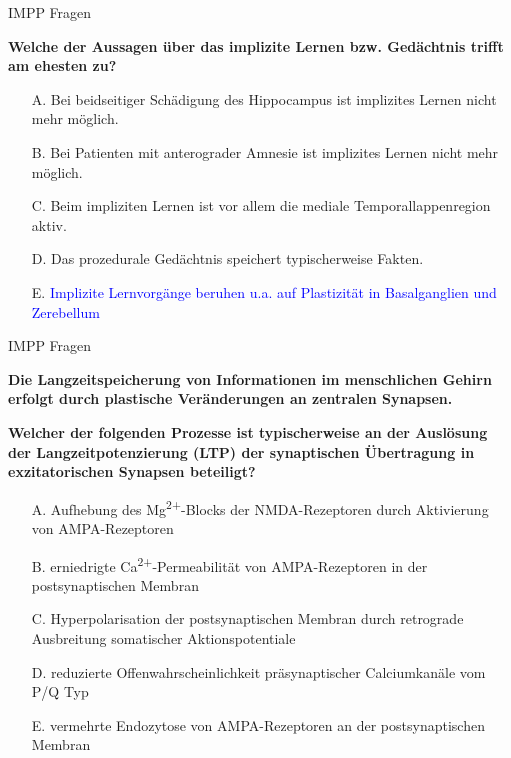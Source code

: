 \documentclass{beamer}
\begin{document}
\begin{frame}{IMPP Fragen}

\textbf{Welche der Aussagen über das implizite Lernen bzw. Gedächtnis trifft am ehesten zu?} \\[0.2 cm]

\begin{itemize}
\item[A.] Bei beidseitiger Schädigung des Hippocampus ist implizites Lernen nicht mehr möglich.
\item[B.] Bei Patienten mit anterograder Amnesie ist implizites Lernen nicht mehr möglich.
\item[C.] Beim impliziten Lernen ist vor allem die mediale Temporallappenregion aktiv.
\item[D.] Das prozedurale Gedächtnis speichert typischerweise Fakten.
\item[E.] \textcolor{blue}{Implizite Lernvorgänge beruhen u.a. auf Plastizität in Basalganglien und Zerebellum} %

\end{itemize}

\end{frame}




\begin{frame}{IMPP Fragen}

\textbf{Die Langzeitspeicherung von Informationen im menschlichen Gehirn erfolgt durch plastische Veränderungen an zentralen Synapsen.}

\textbf{Welcher der folgenden Prozesse ist typischerweise an der Auslösung der Langzeitpotenzierung (LTP) der synaptischen Übertragung in exzitatorischen Synapsen beteiligt? } \\[0.2 cm]

\begin{itemize}
\item[A.] Aufhebung des Mg\textsuperscript{2+}-Blocks der NMDA-Rezeptoren durch Aktivierung von AMPA-Rezeptoren
\item[B.] erniedrigte Ca\textsuperscript{2+}-Permeabilität von AMPA-Rezeptoren in der postsynaptischen Membran
\item[C.] Hyperpolarisation der postsynaptischen Membran durch retrograde Ausbreitung somatischer Aktionspotentiale
\item[D.] reduzierte Offenwahrscheinlichkeit präsynaptischer Calciumkanäle vom P/Q Typ
\item[E.] vermehrte Endozytose von AMPA-Rezeptoren an der postsynaptischen Membran

\end{itemize}

\end{frame}
\end{document}
